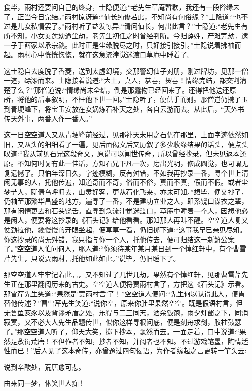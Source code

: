 \begin{parag}
    食毕，雨村还要问自己的终身，士隐便道:“老先生草庵暂歇，我还有一段俗缘未了，正当今日完结。”雨村惊讶道:“仙长纯修若此，不知尚有何俗缘？”士隐道:“也不过是儿女私情罢了。”雨村听了益发惊异:“请问仙长，何出此言？”士隐道:“老先生有所不知，小女英莲幼遭尘劫，老先生初任之时曾经判断。今归薛姓，产难完劫，遗一子于薛家以承宗祧。此时正是尘缘脱尽之时，只好接引接引。”士隐说着拂袖而起。雨村心中恍恍惚惚，就在这急流津觉迷渡口草庵中睡着了。
\end{parag}


\begin{parag}
    这士隐自去度脱了香菱，送到太虚幻境，交那警幻仙子对册，刚过牌坊，见那一僧一道，缥渺而来。士隐接着说道:“大士，真人，恭喜，贺喜！情缘完结，都交割清楚了么？”那僧道说:“情缘尚未全结，倒是那蠢物已经回来了。还得把他送还原所，将他的后事叙明，不枉他下世一回。”士隐听了，便供手而别。那僧道仍携了玉到青埂峰下，将宝玉安放在女娲炼石补天之处，各自云游而去。从此后，“天外书传天外事，两番人作一番人。”
\end{parag}


\begin{parag}
    这一日空空道人又从青埂峰前经过，见那补天未用之石仍在那里，上面字迹依然如旧，又从头的细细看了一遍，见后面偈文后又历叙了多少收缘结果的话头，便点头叹道:“我从前见石兄这段奇文，原说可以闻世传奇，所以曾经抄录，但未见返本还原。不知何时复有此一佳话，方知石兄下凡一次，磨出光明，修成圆觉，也可谓无复遗憾了。只怕年深日久，字迹模糊，反有舛错，不如我再抄录一番，寻个世上清闲无事的人，托他传遍，知道奇而不奇，俗而不俗，真而不真，假而不假。或者尘梦劳人，聊倩鸟呼归去，山灵好客，更从石化飞来，亦未可知。”想毕，便又抄了，仍袖至那繁华昌盛的地方，遍寻了一番，不是建功立业之人，即系饶口谋衣之辈，那有闲情更去和石头饶舌。直寻到急流津觉迷渡口，草庵中睡着一个人，因想他必是闲人，便要将这抄录的《石头记》给他看看。那知那人再叫不醒。空空道人复又使劲拉他，纔慢慢的开眼坐起，便草草一看，仍旧掷下道:“这事我早已亲见尽知。你这抄录的尚无舛错，我只指与你一个人，托他传去，便可归结这一新鲜公案了。”空空道人忙问何人，那人道:“你须待某年某月某日到一个悼红轩中，有个曹雪芹先生，只说贾雨村言托他如此如此。”说毕，仍旧睡下了。
\end{parag}


\begin{parag}
    那空空道人牢牢记着此言，又不知过了几世几劫，果然有个悼红轩，见那曹雪芹先生正在那里翻阅历来的古史。空空道人便将贾雨村言了，方把这《石头记》示看。那雪芹先生笑道:“果然是‘贾雨村言’了！”空空道人便问:“先生何以认得此人，便肯替他传述？”曹雪芹先生笑道:“说你空，原来你肚里果然空空。既是假语村言，但无鲁鱼亥豕以及背谬矛盾之处，乐得与二三同志，酒余饭饱，雨夕灯窗之下，同消寂寞，又不必大人先生品题传世，似你这样寻根问底，便是刻舟求剑，胶柱鼓瑟了。”那空空道人听了，仰天大笑，掷下抄本，飘然而去。一面走着，口中说道:“果然是敷衍荒唐！不但作者不知，抄者不知，并阅者也不知。不过游戏笔墨，陶情适性而已！”后人见了这本奇传，亦曾题过四句偈语，为作者缘起之言更转一竿头云:
\end{parag}


\begin{poem}
    \begin{pl}
        说到辛酸处，荒唐愈可悲。
    \end{pl}

    \begin{pl}
        由来同一梦，休笑世人痴！
    \end{pl}
\end{poem}
